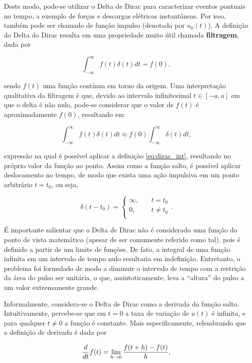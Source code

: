 \documentclass{article}
\numberwithin{equation}{section}
\let\dfr\dfrac
\begin{document}
\begin{itemize}
    Deste modo, pode-se utilizar o Delta de Dirac para caracterizar eventos pontuais no tempo, a exemplo de forças e descargas elétricas instantâneas. Por isso, também pode ser chamado de função impulso (denotada por $u_0(t)$). A definição do Delta do Dirac resulta em uma propriedade muito útil chamada \textbf{filtragem}, dada por

    $$
        \displaystyle{\int_{-\infty}^{\infty}{f(t)\delta(t)dt}} = f(0),
    $$

    \noindent sendo $f(t)$ uma função contínua em torno da origem. Uma interpretação qualitativa da filtragem é que, devido ao intervalo infinitesimal $t \in [-a,a]$ em que o delta é não nulo, pode-se considerar que o valor de $f(t)$ é aproximadamente $f(0)$, resultando em

    $$
        \displaystyle{\int_{-\infty}^{\infty}{f(t)\delta(t)dt}} \approx
        f(0) \displaystyle{\int_{-\infty}^{\infty}{\delta(t)dt}},
    $$

    \noindent expressão na qual é possível aplicar a definição \eqref{eq:dirac_int}, resultando no próprio valor da função no ponto. Assim como a função salto, é possível aplicar deslocamento no tempo, de modo que exista uma ação impulsiva em um ponto arbitrário $t=t_0$, ou seja,

    $$\delta(t-t_0) =
        \begin{cases}
            \infty, &\quad t=t_0 \\
            0, &\quad t\neq t_0 \\
        \end{cases}.
        $$

    É importante salientar que o Delta de Dirac não é considerado uma função do ponto de vista matemático (apesar de ser comumente referido como tal), pois é definido a partir de um limite de funções. De fato, a integral de uma função infinita em um intervalo de tempo nulo resultaria em indefinição. Entretanto, o problema foi formulado de modo a diminuir o intervalo de tempo com a restrição da área do pulso ser unitária, o que, assintoticamente, leva a ``altura'' do pulso a um valor extremamente grande.

    Informalmente, considera-se o Delta de Dirac como a derivada da função salto. Intuitivamente, percebe-se que em $t=0$ a taxa de variação de $u(t)$ é infinita, e para qualquer $t \neq 0$ a função é constante. Mais especificamente, relembrando que a definição de derivada é dada por

    \begin{equation}
        \dfr{d}{dt}f(t) = \operatornamewithlimits{lim}_{h \to 0} \label{eq:derivada_def} \dfr{f(t+h)-f(t)}{h},
    \end{equation}


\end{itemize}
\end{document}
